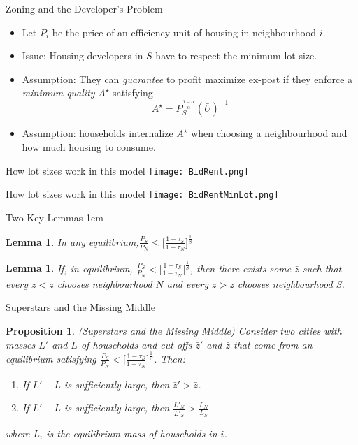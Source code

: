 \documentclass{beamer}
\theoremstyle{plain}
\newtheorem{lem}[thm]{Lemma}
\newtheorem{prop}{Proposition}
\begin{document}
\begin{frame}{Zoning and the Developer's Problem}
	\begin{itemize}
		\color{black}
		\item Let $P_{i}$ be the price of an efficiency unit of housing in neighbourhood $i$. 
		\item Issue: Housing developers in $S$ have to respect the minimum lot size. 
		\item Assumption: They can \textit{guarantee} to profit maximize ex-post if they enforce a \textit{minimum quality} $A^{\star}$ satisfying 
		\begin{equation}
			A^{\star} = P_{S}^{\frac{1-\alpha}{\alpha}}(\bar{U})^{-1}
		\end{equation}
		\item Assumption: households internalize $A^{\star}$ when choosing a neighbourhood and how much housing to consume.
	\end{itemize}
\end{frame}

\begin{frame}{How lot sizes work in this model}
\texttt{[image: BidRent.png]}
\end{frame}

\begin{frame}{How lot sizes work in this model}
\texttt{[image: BidRentMinLot.png]}
\end{frame}

\begin{frame}{Two Key Lemmas}
	\itemsep1em
	\begin{lem}
		In any equilibrium,$\frac{P_{S}}{P_{N}} \leq \bigg[\frac{1-\tau_{S}}{1-\tau_{N}}\bigg]^{\frac{1}{\beta}}$ \pause
	\end{lem}
	\begin{lem}
		If, in equilibrium, $\frac{P_{S}}{P_{N}} < \bigg[\frac{1-\tau_{S}}{1-\tau_{N}}\bigg]^{\frac{1}{\beta}}$, then there exists some $\bar{z}$ such that every $z < \bar{z}$ chooses neighbourhood $N$ and every $z > \bar{z}$ chooses neighbourhood S. 
	\end{lem}
\end{frame}


\begin{frame}{Superstars and the Missing Middle}
	\begin{prop}
		(Superstars and the Missing Middle) Consider two cities with masses $L'$ and $L$ of households and cut-offs $\bar{z}'$ and $\bar{z}$ that come from an equilibrium satisfying $\frac{P_{S}}{P_{N}} < \bigg[\frac{1-\tau_{S}}{1-\tau_{N}}\bigg]^{\frac{1}{\beta}}$. Then:
		\begin{enumerate}
			\item If $L' - L$ is sufficiently large, then $\bar{z}' > \bar{z}$.
			\item  If $L' - L$ is sufficiently large, then $\frac{L'_{N}}{L'_{S}} > \frac{L_{N}}{L_{S}}$ 
		\end{enumerate} 
		where $L_{i}$ is the equilibrium mass of households in $i$.
	\end{prop}	
\end{frame}
\end{document}

